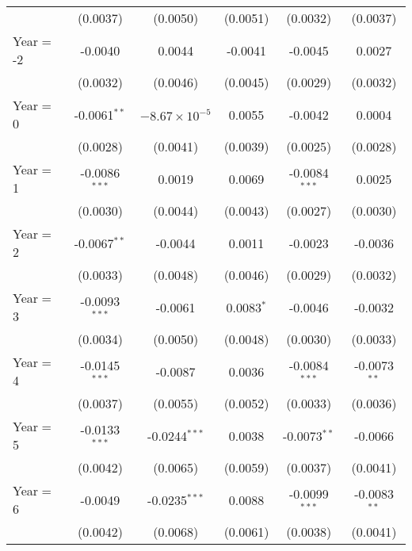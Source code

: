 \begin{table}[htbp]
\begin{tabular}{lccccc}
                           & (0.0037)        & (0.0050)               & (0.0051)       & (0.0032)        & (0.0037)\\
      Year$=$-2            & -0.0040         & 0.0044                 & -0.0041        & -0.0045         & 0.0027\\
                           & (0.0032)        & (0.0046)               & (0.0045)       & (0.0029)        & (0.0032)\\
      Year$=$0             & -0.0061$^{**}$  & $-8.67\times 10^{-5}$ & 0.0055         & -0.0042         & 0.0004\\
                           & (0.0028)        & (0.0041)               & (0.0039)       & (0.0025)        & (0.0028)\\
      Year$=$1             & -0.0086$^{***}$ & 0.0019                 & 0.0069         & -0.0084$^{***}$ & 0.0025\\
                           & (0.0030)        & (0.0044)               & (0.0043)       & (0.0027)        & (0.0030)\\
      Year$=$2             & -0.0067$^{**}$  & -0.0044                & 0.0011         & -0.0023         & -0.0036\\
                           & (0.0033)        & (0.0048)               & (0.0046)       & (0.0029)        & (0.0032)\\
      Year$=$3             & -0.0093$^{***}$ & -0.0061                & 0.0083$^{*}$   & -0.0046         & -0.0032\\
                           & (0.0034)        & (0.0050)               & (0.0048)       & (0.0030)        & (0.0033)\\
      Year$=$4             & -0.0145$^{***}$ & -0.0087                & 0.0036         & -0.0084$^{***}$ & -0.0073$^{**}$\\
                           & (0.0037)        & (0.0055)               & (0.0052)       & (0.0033)        & (0.0036)\\
      Year$=$5             & -0.0133$^{***}$ & -0.0244$^{***}$        & 0.0038         & -0.0073$^{**}$  & -0.0066\\
                           & (0.0042)        & (0.0065)               & (0.0059)       & (0.0037)        & (0.0041)\\
      Year$=$6             & -0.0049         & -0.0235$^{***}$        & 0.0088         & -0.0099$^{***}$ & -0.0083$^{**}$\\
                           & (0.0042)        & (0.0068)               & (0.0061)       & (0.0038)        & (0.0041)\\

\end{tabular}
\end{table}
